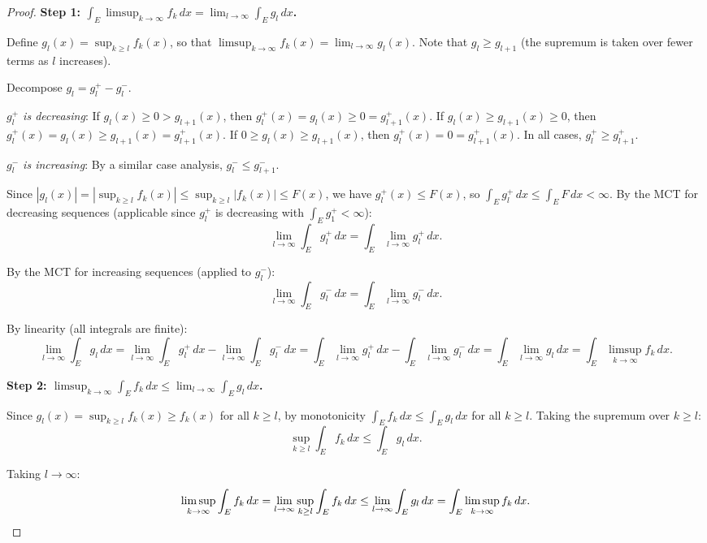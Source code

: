 \documentclass[11pt]{report}
\begin{document}
\begin{proof}
\textbf{Step 1: $\int_E \limsup_{k \to \infty} f_k\,dx = \lim_{l \to \infty} \int_E g_l\,dx$.}

Define $g_l(x) = \sup_{k \geq l} f_k(x)$, so that $\limsup_{k \to \infty} f_k(x) = \lim_{l \to \infty} g_l(x)$. Note that $g_l \geq g_{l+1}$ (the supremum is taken over fewer terms as $l$ increases).

Decompose $g_l = g_l^+ - g_l^-$.

\textit{$g_l^+$ is decreasing}: If $g_l(x) \geq 0 > g_{l+1}(x)$, then $g_l^+(x) = g_l(x) \geq 0 = g_{l+1}^+(x)$. If $g_l(x) \geq g_{l+1}(x) \geq 0$, then $g_l^+(x) = g_l(x) \geq g_{l+1}(x) = g_{l+1}^+(x)$. If $0 \geq g_l(x) \geq g_{l+1}(x)$, then $g_l^+(x) = 0 = g_{l+1}^+(x)$. In all cases, $g_l^+ \geq g_{l+1}^+$.

\textit{$g_l^-$ is increasing}: By a similar case analysis, $g_l^- \leq g_{l+1}^-$.

Since $|g_l(x)| = |\sup_{k \geq l} f_k(x)| \leq \sup_{k \geq l} |f_k(x)| \leq F(x)$, we have $g_l^+(x) \leq F(x)$, so $\int_E g_l^+\,dx \leq \int_E F\,dx < \infty$. By the MCT for decreasing sequences (applicable since $g_l^+$ is decreasing with $\int_E g_1^+ < \infty$):
\[
\lim_{l \to \infty} \int_E g_l^+\,dx = \int_E \lim_{l \to \infty} g_l^+\,dx.
\]

By the MCT for increasing sequences (applied to $g_l^-$):
\[
\lim_{l \to \infty} \int_E g_l^-\,dx = \int_E \lim_{l \to \infty} g_l^-\,dx.
\]

By linearity (all integrals are finite):
\[
\lim_{l \to \infty} \int_E g_l\,dx = \lim_{l \to \infty} \int_E g_l^+\,dx - \lim_{l \to \infty} \int_E g_l^-\,dx = \int_E \lim_{l \to \infty} g_l^+\,dx - \int_E \lim_{l \to \infty} g_l^-\,dx = \int_E \lim_{l \to \infty} g_l\,dx = \int_E \limsup_{k \to \infty} f_k\,dx.
\]

\textbf{Step 2: $\limsup_{k \to \infty} \int_E f_k\,dx \leq \lim_{l \to \infty} \int_E g_l\,dx$.}

Since $g_l(x) = \sup_{k \geq l} f_k(x) \geq f_k(x)$ for all $k \geq l$, by monotonicity $\int_E f_k\,dx \leq \int_E g_l\,dx$ for all $k \geq l$. Taking the supremum over $k \geq l$:
\[
\sup_{k \geq l} \int_E f_k\,dx \leq \int_E g_l\,dx.
\]

Taking $l \to \infty$:
\[
\limsup_{k \to \infty} \int_E f_k\,dx = \lim_{l \to \infty} \sup_{k \geq l} \int_E f_k\,dx \leq \lim_{l \to \infty} \int_E g_l\,dx = \int_E \limsup_{k \to \infty} f_k\,dx. \qedhere
\]
\end{proof}
\end{document}
